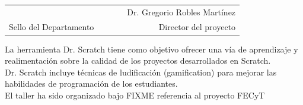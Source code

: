 \documentclass[12pt]{article}
\begin{document}
\begin{center}
\begin{table}[h]
\footnotesize
\begin{center}
\begin{tabular}{lp{1cm}cp{1cm}r}
\Large{ } & & 
\Large{  } & & 
\Large{Dr. Gregorio Robles Martínez} \\
Sello del Departamento & &
 & & 
Director del proyecto \\ 
\end{tabular}
\end{center}
\end{table}

\vspace{-0.5cm}

\scriptsize 
{La herramienta Dr. Scratch tiene como objetivo ofrecer una vía de aprendizaje y realimentación sobre la calidad de los proyectos desarrollados en Scratch. \\ Dr. Scratch incluye técnicas de ludificación (gamification) para mejorar las habilidades de programación de los estudiantes. \\ 
El taller ha sido organizado bajo FIXME referencia al proyecto FECyT}

\end{center}
\end{document}
